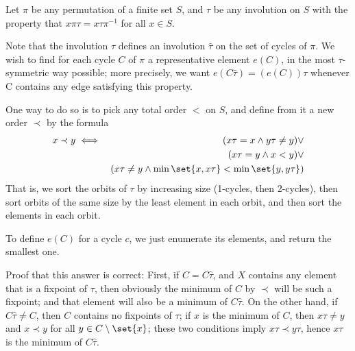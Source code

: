 Let $\pi$ be any permutation of a finite set $S$, and $\tau$ be any
involution on $S$ with the property that $x\pi\tau = x\tau\pi^{-1}$
for all $x\in S$.

Note that the involution $\tau$ defines an involution $\hat\tau$ on the set
of cycles of $\pi$.  We wish to find for each cycle $C$ of $\pi$
a representative element $e(C)$, in the most $\tau$-symmetric way possible;
more precisely, we want $e(C\hat\tau)=(e(C))\tau$ whenever C contains
any edge satisfying this property.

One way to do so is to pick any total order $<$ on $S$, and define 
from it a new order $\prec$ by the formula
\begin{eqnarray*}
  x\prec y &\iff & (x\tau = x \wedge y\tau\neq y) \vee \\
   & & (x\tau = y \wedge x<y) \vee \\
   & & (x\tau\neq y\wedge \min\set{x,x\tau} < \min\set{y,y\tau})
\end{eqnarray*}
That is, we sort the orbits of $\tau$ by increasing size (1-cycles,
then 2-cycles), then sort orbits of the same size by the
least element in each orbit, and then sort the elements in each orbit.

To define $e(C)$ for a cycle $c$, we just enumerate its elements,
and return the smallest one.

Proof that this answer is correct: First, if $C=C\hat\tau$, and $X$
contains any element that is a fixpoint of $\tau$, then obviously the
minimum of $C$ by $\prec$ will be such a fixpoint; and that element
will also be a minimum of $C\hat\tau$. On the other hand, if
$C\hat\tau\neq C$, then $C$ contains no fixpoints of $\tau$; if $x$ is
the minimum of $C$, then $x\tau\neq y$ and $x\prec y$ for all $y\in
C\setminus\set{x}$; these two conditions imply $x\tau\prec y\tau$,
hence $x\tau$ is the minimum of $C\hat\tau$.

  
    
